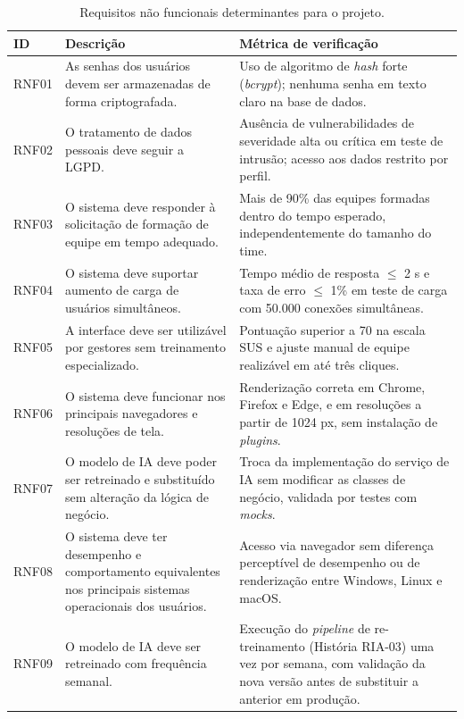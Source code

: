 \documentclass[a4paper,12pt,oneside,openany]{book}
\begin{document}
\begin{table}[H]
\centering
\caption{Requisitos não funcionais determinantes para o projeto.}
\label{tab:rnf}
\begin{tabularx}{0.95\textwidth}{p{} p{} X}
\toprule
\textbf{ID} & \textbf{Descrição} & \textbf{Métrica de verificação} \\
\midrule
RNF01 & As senhas dos usuários devem ser armazenadas de forma criptografada. &
Uso de algoritmo de \textit{hash} forte (\textit{bcrypt}); nenhuma senha em
texto claro na base de dados. \\
RNF02 & O tratamento de dados pessoais deve seguir a LGPD. & Ausência de
vulnerabilidades de severidade alta ou crítica em teste de intrusão; acesso aos
dados restrito por perfil. \\
RNF03 & O sistema deve responder à solicitação de formação de equipe em tempo
adequado. & Mais de 90\% das equipes formadas dentro do tempo esperado,
independentemente do tamanho do time. \\
RNF04 & O sistema deve suportar aumento de carga de usuários simultâneos. &
Tempo médio de resposta $\leq$ 2 s e taxa de erro $\leq$ 1\% em teste de carga
com 50.000 conexões simultâneas. \\
RNF05 & A interface deve ser utilizável por gestores sem treinamento
especializado. & Pontuação superior a 70 na escala SUS e ajuste manual de equipe
realizável em até três cliques. \\
RNF06 & O sistema deve funcionar nos principais navegadores e resoluções de
tela. & Renderização correta em Chrome, Firefox e Edge, e em resoluções a partir
de 1024 px, sem instalação de \textit{plugins}. \\
RNF07 & O modelo de IA deve poder ser retreinado e substituído sem alteração da
lógica de negócio. & Troca da implementação do serviço de IA sem modificar as
classes de negócio, validada por testes com \textit{mocks}. \\
RNF08 & O sistema deve ter desempenho e comportamento equivalentes nos
principais sistemas operacionais dos usuários. & Acesso via navegador sem
diferença perceptível de desempenho ou de renderização entre Windows, Linux
e macOS. \\
RNF09 & O modelo de IA deve ser retreinado com frequência semanal. & Execução
do \textit{pipeline} de re-treinamento (História RIA-03) uma vez por semana,
com validação da nova versão antes de substituir a anterior em produção. \\
\bottomrule
\end{tabularx}
\end{table}
\end{document}
